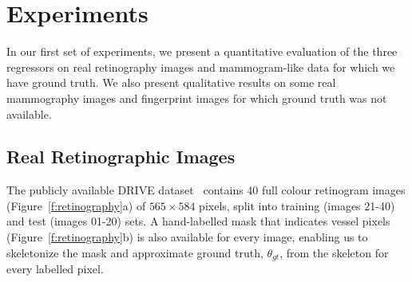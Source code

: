 \documentclass{bmvc2k}
\newcommand{\fref}[1]{Figure~\ref{#1}}
\newcommand{\comment}[1]{}
\begin{document}
\comment{
\item When estimating orientation with a tree (or forest of trees), there is a particular problem when the output is limited to a specific range e.g. (0,2pi]. At the two extremes of the range, samples in the bins near the end are biased toward the centre of the range such that, in our case, it is very unlikely that a 0 or 2pi will be output by the forest.
Random Forests (or trees for that matter) have the option of giving us a multimodal distribution over orientation which will be useful at points where lines cross.
One advantage of the (pruned) tree approach is that each bin contains a number of training samples such that we can estimate a mean value and an uncertainty (variance) for every leaf. In other words, the variance is very much data dependent.
This then propagates in the case of a Random Forest since the individual tree outputs can be combined with their respective variance accounted for correctly.
The output from the Random Forest is always between 0 and 1 in magnitude. Question: should we be taking the square root of the complex vector to halve the angle (and therefore sqrt the magnitude also)? At the moment, vectors are weighed by their unsquared magnitude.
}


\section{Experiments}
\label{s:expts}
In our first set of experiments, we present a quantitative evaluation of the three regressors on real retinography images and mammogram-like data for which we have ground truth. We also present qualitative results on some real mammography images and fingerprint images for which ground truth was not available.


\subsection{Real Retinographic Images}
\label{s:expts_retinography}
The publicly available DRIVE dataset~\cite{Staal_etal_TMI04} contains 40 full colour retinogram images (\fref{f:retinography}a) of $565{\times}584$ pixels, split into training (images 21-40) and test (images 01-20) sets. A hand-labelled mask that indicates vessel pixels (\fref{f:retinography}b) is also available for every image, enabling us to skeletonize the mask and approximate ground truth, $\theta_{gt}$, from the skeleton for every labelled pixel.\comment{It is questionable how well this constitutes ground truth}
\end{document}

